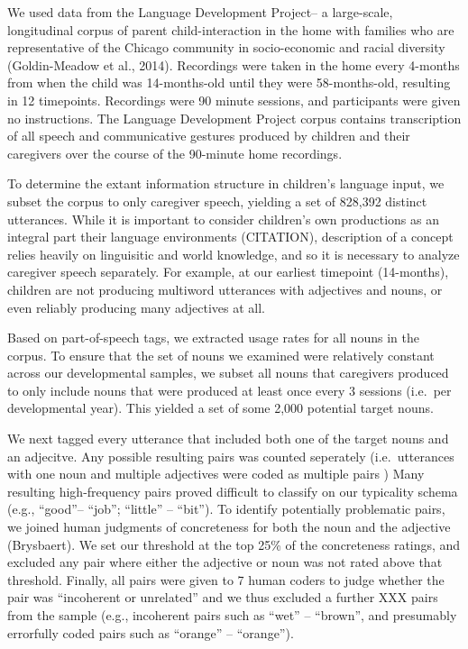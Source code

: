 \documentclass[10pt, letterpaper]{article}
\begin{document}
We used data from the Language Development Project-- a large-scale,
longitudinal corpus of parent child-interaction in the home with
families who are representative of the Chicago community in
socio-economic and racial diversity (Goldin-Meadow et al., 2014).
Recordings were taken in the home every 4-months from when the child was
14-months-old until they were 58-months-old, resulting in 12 timepoints.
Recordings were 90 minute sessions, and participants were given no
instructions. The Language Development Project corpus contains
transcription of all speech and communicative gestures produced by
children and their caregivers over the course of the 90-minute home
recordings.

To determine the extant information structure in children's language
input, we subset the corpus to only caregiver speech, yielding a set of
828,392 distinct utterances. While it is important to consider
children's own productions as an integral part their language
environments (CITATION), description of a concept relies heavily on
linguisitic and world knowledge, and so it is necessary to analyze
caregiver speech separately. For example, at our earliest timepoint
(14-months), children are not producing multiword utterances with
adjectives and nouns, or even reliably producing many adjectives at all.

Based on part-of-speech tags, we extracted usage rates for all nouns in
the corpus. To ensure that the set of nouns we examined were relatively
constant across our developmental samples, we subset all nouns that
caregivers produced to only include nouns that were produced at least
once every 3 sessions (i.e.~per developmental year). This yielded a set
of some 2,000 potential target nouns.

We next tagged every utterance that included both one of the target
nouns and an adjecitve. Any possible resulting pairs was counted
seperately (i.e.~utterances with one noun and multiple adjectives were
coded as multiple pairs ) Many resulting high-frequency pairs proved
difficult to classify on our typicality schema (e.g., ``good''--
``job''; ``little'' -- ``bit''). To identify potentially problematic
pairs, we joined human judgments of concreteness for both the noun and
the adjective (Brysbaert). We set our threshold at the top 25\% of the
concreteness ratings, and excluded any pair where either the adjective
or noun was not rated above that threshold. Finally, all pairs were
given to 7 human coders to judge whether the pair was ``incoherent or
unrelated'' and we thus excluded a further XXX pairs from the sample
(e.g., incoherent pairs such as ``wet'' -- ``brown'', and presumably
errorfully coded pairs such as ``orange'' -- ``orange'').
\end{document}
